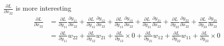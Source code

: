 $\frac{\partial L}{\partial x_{22}}$ is more interesting 
\begin{equation*}
\begin{split}
\frac{\partial L}{\partial x_{22}} & = 
\frac{\partial L}{\partial y_{11}} \frac{\partial y_{11}}{\partial x_{22}} +
\frac{\partial L}{\partial y_{12}} \frac{\partial y_{12}}{\partial x_{22}} + 
\frac{\partial L}{\partial y_{13}} \frac{\partial y_{13}}{\partial x_{22}} +  
\frac{\partial L}{\partial y_{21}} \frac{\partial y_{21}}{\partial x_{22}} +
\frac{\partial L}{\partial y_{22}} \frac{\partial y_{22}}{\partial x_{22}} + 
\frac{\partial L}{\partial y_{23}} \frac{\partial y_{23}}{\partial x_{22}} \\
 & = 
\frac{\partial L}{\partial y_{11}} w_{22} +
\frac{\partial L}{\partial y_{12}} w_{21} + 
\frac{\partial L}{\partial y_{13}} \times 0 +  
\frac{\partial L}{\partial y_{21}} w_{12} +
\frac{\partial L}{\partial y_{22}} w_{11} + 
\frac{\partial L}{\partial y_{23}} \times 0 \\
\end{split}
\end{equation*}


